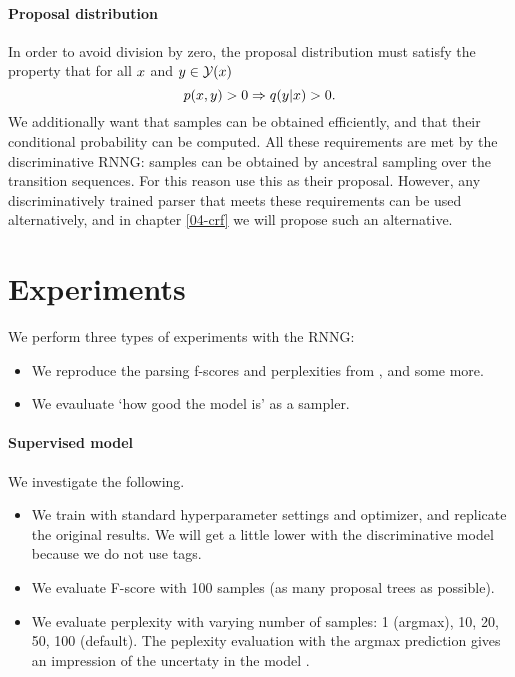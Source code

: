 \paragraph{Proposal distribution}
In order to avoid division by zero, the proposal distribution must satisfy the property that for all $x$ and $y \in \mathcal{Y}(x)$
\begin{equation*}
  p(x, y) > 0 \Rightarrow q( y| x ) > 0.
\end{equation*}
We additionally want that samples can be obtained efficiently, and that their conditional probability can be computed. All these requirements are met by the discriminative RNNG: samples can be obtained by ancestral sampling over the transition sequences. For this reason \citet{dyer2016rnng} use this as their proposal. However, any discriminatively trained parser that meets these requirements can be used alternatively, and in chapter \ref{04-crf} we will propose such an alternative.

\section{Experiments}
We perform three types of experiments with the RNNG:
\begin{itemize}
  \item We reproduce the parsing f-scores and perplexities from \citep{dyer2016rnng}, and some more.
  \item We evauluate `how good the model is' as a sampler.
\end{itemize}

\paragraph{Supervised model} We investigate the following.
\begin{itemize}
  \item We train with standard hyperparameter settings and optimizer, and replicate the original results. We will get a little lower with the discriminative model because we do not use tags.
  \item We evaluate F-score with 100 samples (as many proposal trees as possible).
  \item We evaluate perplexity with varying number of samples: 1 (argmax), 10, 20, 50, 100 (default). The peplexity evaluation with the argmax prediction gives an impression of the uncertaty in the model \citep{buys2018exact}.
\end{itemize}

